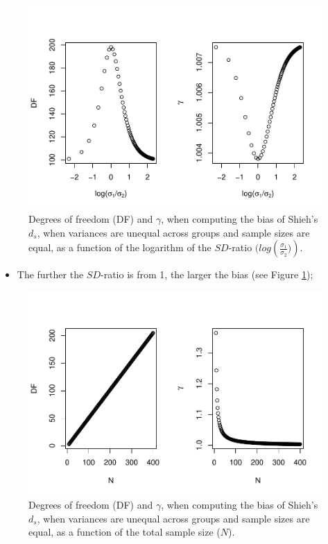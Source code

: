 \documentclass[
  english,
  man,mask]{apa6}
\providecommand{\tightlist}{%
  \setlength{\itemsep}{0pt}\setlength{\parskip}{0pt}}
\begin{document}
\begin{figure}
\centering
\includegraphics{Theoretical-Bias-of-all-estimators-as-a-function-of-population-parameters_files/figure-latex/biasshiehhetbalSDratio2-1.pdf}
\caption{\label{fig:biasshiehhetbalSDratio2}Degrees of freedom (DF) and \(\gamma\), when computing the bias of Shieh's \(d_s\), when variances are unequal across groups and sample sizes are equal, as a function of the logarithm of the \(SD\)-ratio \((log \left(\frac{\sigma_1}{\sigma_2})\right)\).}
\end{figure}

\begin{itemize}
\tightlist
\item
  The further the \(SD\)-ratio is from 1, the larger the bias (see Figure \ref{fig:biasshiehhetbalSDratio2});
\end{itemize}

\begin{figure}
\centering
\includegraphics{Theoretical-Bias-of-all-estimators-as-a-function-of-population-parameters_files/figure-latex/biasshiehhetbalNsize2-1.pdf}
\caption{\label{fig:biasshiehhetbalNsize2}Degrees of freedom (DF) and \(\gamma\), when computing the bias of Shieh's \(d_s\), when variances are unequal across groups and sample sizes are equal, as a function of the total sample size (\(N\)).}
\end{figure}
\end{document}
